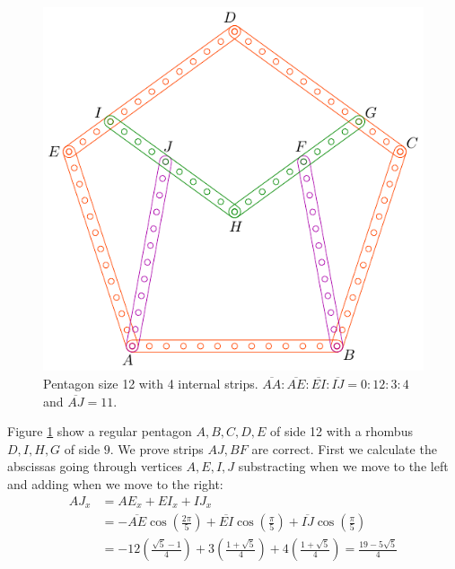 \documentclass[11pt]{article}
\begin{document}
\begin{figure}[h]
 \centering
 \includegraphics[scale=1.1]{12/penta12a}
 \caption{Pentagon size 12 with 4 internal strips. $\overline{AA}:\overline{AE}:\overline{EI}:\overline{IJ} = 0:12:3:4$ and $\overline{AJ}=11$.}
 \label{fig:penta12a}
\end{figure}

Figure \ref{fig:penta12a} show a regular pentagon $A,B,C,D,E$ of side 12 with a rhombus $D,I,H,G$ of side $9$. We prove strips $AJ,BF$ are correct. First we calculate the abscissas going through vertices $A,E,I,J$ substracting when we move to the left and adding when we move to the right:
\begin{align}
AJ_x &= AE_x + EI_x + IJ_x\nonumber\\
 &= -\overline{AE}\cos\left(\frac{2\pi}5\right)
 + \overline{EI}\cos\left(\frac{\pi}5\right) 
 + \overline{IJ}\cos\left(\frac{\pi}5\right)\nonumber\\
 &= -12\left(\frac{\sqrt5 - 1}4\right)
  +3\left(\frac{1+\sqrt5}4\right)
  +4\left(\frac{1+\sqrt5}4\right) 
  = \frac{19-5\sqrt5}4
\end{align}
\end{document}
